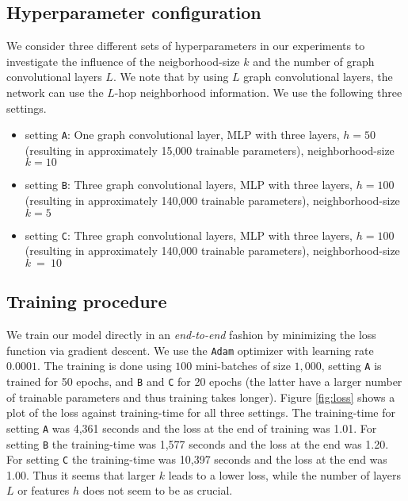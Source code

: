 \documentclass[]{article}
\begin{document}
\newcommand{\A}{\texttt{A}\xspace}
\newcommand{\B}{\texttt{B}\xspace}
\newcommand{\C}{\texttt{C}\xspace}

\subsection{Hyperparameter configuration}

We consider three different sets of hyperparameters in our experiments to 
investigate the influence of the neigborhood-size $k$ and the number of graph 
convolutional layers $L$. We note that by using $L$ graph convolutional layers, 
the network can use the $L$-hop neighborhood information.
We use the following three settings. 

\begin{itemize}
	\item setting \A: One graph convolutional layer, MLP with three layers, 
	$h=50$ (resulting in approximately 15,000 trainable parameters), 
	neighborhood-size $k=10$
	\item setting \B: Three graph convolutional layers, MLP with three layers, 
	$h=100$ (resulting in approximately 140,000 trainable parameters), 
	neighborhood-size $k=5$ 
	\item setting \C: Three graph convolutional layers, MLP with three layers, 
	$h=100$ (resulting in approximately 140,000 trainable parameters), 
	neighborhood-size $k~=~10$ 
\end{itemize}



\subsection{Training procedure}

We train our model directly in an \emph{end-to-end} fashion by minimizing the 
loss function via gradient descent. We use the \texttt{Adam} optimizer 
\cite{kingma2014adam} with learning rate $0.0001$. The training is done using 
$100$ mini-batches of size $1,000$, setting \A is trained for 50 epochs, and \B 
and \C for 20 epochs (the latter have a larger number of trainable parameters 
and thus training takes longer). Figure \ref{fig:loss} shows a plot of the loss 
against training-time for all three settings. The training-time for setting \A 
was 4,361 seconds and the loss at the end of training was 1.01. For setting \B 
the training-time  
was 1,577 seconds and the loss at the end was 1.20. For setting \C the 
training-time was 
10,397 seconds and the loss at the end was 1.00. Thus it seems that larger $k$ 
leads to a lower loss, while the number of layers $L$ or features $h$ does not 
seem to 
be as crucial.
\end{document}
